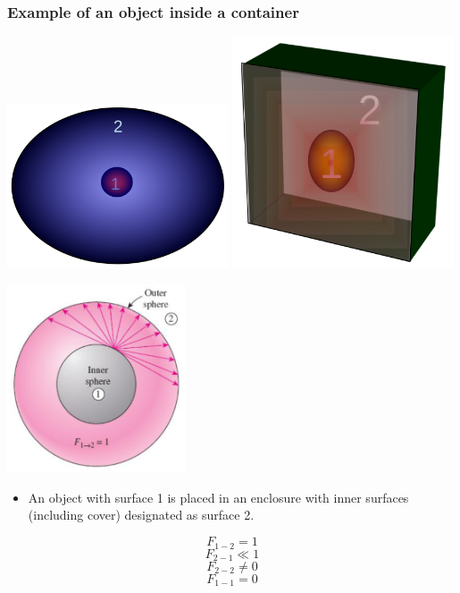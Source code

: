 \documentclass[11pt]{article}
\begin{document}
\subsubsection{Example of an object inside a container}
\label{sec:orge1499b8}
\begin{center}
\includegraphics[width=0.49\textwidth]{./images/view-factor-object-inside-a-spherical-container-example-diagram.png}
\includegraphics[width=0.49\textwidth]{./images/view-factor-object-inside-a-rectangular-container-example-diagram.png}
\end{center}
\begin{center}
\includegraphics[height=15em]{./images/view-factor-object-inside-a-spherical-container-example-detailed-diagram.png}
\end{center}
\begin{itemize}
\item An object with surface 1 is placed in an enclosure with inner surfaces (including cover) designated as surface 2.
\end{itemize}
\[F_{1-2} = 1\]
\[F_{2-1} \ll 1\]
\[F_{2-2} \ne 0\]
\[F_{1-1} = 0\]
\end{document}
